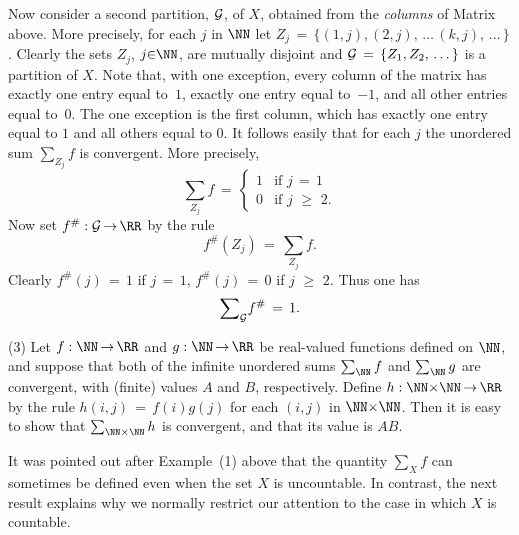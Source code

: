         Now  consider a second partition, ${\cal G}$, of $X$, obtained from the {\em columns} of Matrix~ above.
    More precisely, for each $j$ in ${\NN}$ let $Z_{j} \,=\, \{(1,j), (2,j),\,{\ldots}\,(k,j),\,{\ldots}\,\}$.
    Clearly the sets $Z_{j}$, $j{\in}{\NN}$, are mutually disjoint and ${\cal G} \,=\, \{Z_{1},Z_{2},\,{\ldots}\,\}$ is a partition of $X$.
    Note that, with one exception, every column of the matrix has exactly one entry equal to~$1$, exactly one entry equal to~$-1$, and all other entries equal to~$0$.
    The one exception is the first column, which has exactly one entry equal to $1$ and all others equal to $0$.
    It follows easily that for each $j$ the unordered sum ${\sum}_{Z_{j}} f$ is convergent.
    More precisely,
        \begin{displaymath}
        {\sum}_{Z_{j}} f \,=\, \left\{
        \begin{array}{rl}
        1 & \mbox{if $j \,=\, 1$} \\
        0 & \mbox{if $j\,\,{\geq}\,\,2$}.
        \end{array}
                                            \right.
        \end{displaymath}
    Now set $f^{\#}:{\cal G} \,{\rightarrow}\, {\RR}$ by the rule
        \begin{displaymath}
        f^{\#}(Z_{j}) \,=\, {\sum}_{Z_{j}} f.
        \end{displaymath}
    Clearly $f^{\#}(j) \,=\, 1$ if $j \,=\, 1$, $f^{\#}(j) \,=\, 0$ if $j\,\,{\geq}\,\,2$.
    Thus one has
        \begin{displaymath}
        {\sum}_{{\cal G}} f^{\#} \,=\, 1.
        \end{displaymath}

\V

        (3) Let $f:{\NN} \,{\rightarrow}\, {\RR}$ and $g:{\NN} \,{\rightarrow}\, {\RR}$ be real-valued functions defined on ${\NN}$,
    and suppose that both of the infinite unordered sums $\sum_{{\NN}} f$ and $\sum_{{\NN}} g$ are convergent, with (finite) values $A$ and $B$, respectively.
    Define $h:{\NN}{\times}{\NN} \,{\rightarrow}\, {\RR}$ by the rule $h(i,j) \,=\, f(i)g(j)$ for each $(i,j)$ in ${\NN}{\times}{\NN}$.
    Then it is easy to show that $\sum_{{\NN}{\times}{\NN}} h$ is convergent, and that its value is $AB$.


\V
\V


        It was pointed out after Example~(1) above that the quantity ${\sum}_{X} f$ can sometimes be defined even when the set $X$ is uncountable.
    In contrast, the next result explains why we normally restrict our attention to the case in which $X$ is countable.

